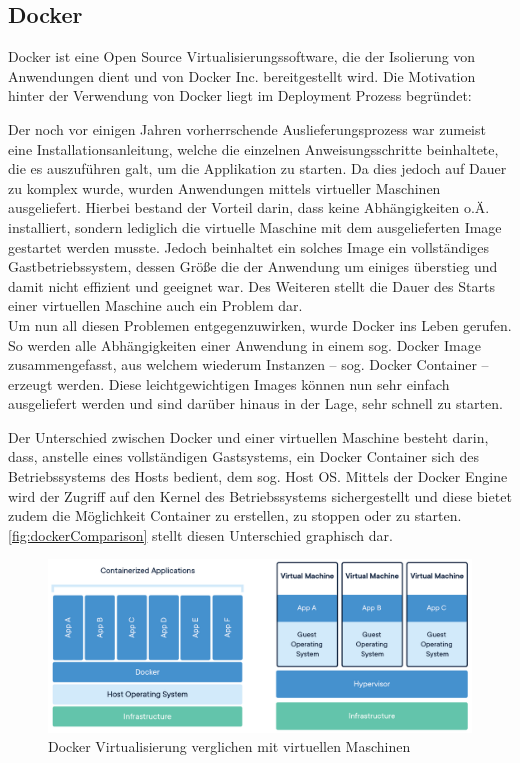 		\subsection{Docker} %
			
			Docker ist eine Open Source Virtualisierungssoftware, die der Isolierung von Anwendungen dient und von Docker Inc. bereitgestellt wird. Die Motivation hinter der Verwendung von Docker liegt im Deployment Prozess begründet: 
			
			Der noch vor einigen Jahren vorherrschende Auslieferungsprozess war zumeist eine Installationsanleitung, welche die einzelnen Anweisungsschritte beinhaltete, die es auszuführen galt, um die Applikation zu starten. Da dies jedoch auf Dauer zu komplex wurde, wurden Anwendungen mittels virtueller Maschinen ausgeliefert. Hierbei bestand der Vorteil darin, dass keine Abhängigkeiten o.Ä. installiert, sondern lediglich die virtuelle Maschine mit dem ausgelieferten Image gestartet werden musste. Jedoch beinhaltet ein solches Image ein vollständiges Gastbetriebssystem, dessen Größe die der Anwendung um einiges überstieg und damit nicht effizient und geeignet war. Des Weiteren stellt die Dauer des Starts einer virtuellen Maschine auch ein Problem dar. \\
			Um nun all diesen Problemen entgegenzuwirken, wurde Docker ins Leben gerufen. So werden alle Abhängigkeiten einer Anwendung in einem sog. Docker Image zusammengefasst, aus welchem wiederum Instanzen -- sog. Docker Container -- erzeugt werden. Diese leichtgewichtigen Images können nun sehr einfach ausgeliefert werden und sind darüber hinaus in der Lage, sehr schnell zu starten. \cite{Huber.2019}
			
			Der Unterschied zwischen Docker und einer virtuellen Maschine besteht darin, dass, anstelle eines vollständigen Gastsystems, ein Docker Container sich des Betriebssystems des Hosts bedient, dem sog. Host OS. Mittels der Docker Engine wird der Zugriff auf den Kernel des Betriebssystems sichergestellt und diese bietet zudem die Möglichkeit Container zu erstellen, zu stoppen oder zu starten. \autoref{fig:dockerComparison} stellt diesen Unterschied graphisch dar. \cite{Turnbull.2014}
			
			\begin{figure}[ht!]
				\centering
				\includegraphics[width=1\textwidth]{images/docker-containerized-and-vm-transparent-bg.png}
				\caption{Docker Virtualisierung verglichen mit virtuellen Maschinen \cite{DockerInc..2020}}
				\label{fig:dockerComparison}
			\end{figure} 
			
